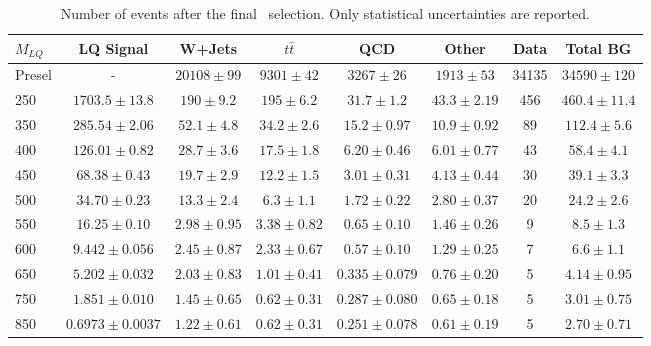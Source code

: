\begin{table} 
  \small 
  \begin{tabular}{l | c | c | c | c | c | c | c} 
    $M_{LQ}$ & LQ Signal & W+Jets & $t\bar{t}$ & QCD & Other & Data &  Total BG \\ 
    \hline 
    \hline 
    Presel & -                     &  $ 20108 \pm 99  $ & $ 9301 \pm 42   $ & $ 3267 \pm 26 $     & $ 1913 \pm 53 $   &34135 & $ 34590 \pm 120 $ \\ 
    \hline 
    250    & $ 1703.5 \pm 13.8 $   &  $ 190  \pm 9.2  $ & $ 195  \pm 6.2  $ & $ 31.7  \pm 1.2  $  & $ 43.3 \pm 2.19 $ &456 & $ 460.4 \pm 11.4 $ \\ 
    350    & $ 285.54 \pm 2.06 $   &  $ 52.1 \pm 4.8  $ & $ 34.2 \pm 2.6  $ & $ 15.2  \pm 0.97 $  & $ 10.9 \pm 0.92 $ &89 & $ 112.4 \pm 5.6 $ \\ 
    400    & $ 126.01 \pm 0.82 $   &  $ 28.7 \pm 3.6  $ & $ 17.5 \pm 1.8  $ & $ 6.20  \pm 0.46 $  & $ 6.01 \pm 0.77 $ &43 & $ 58.4 \pm 4.1 $ \\ 
    450    & $ 68.38 \pm 0.43 $    &  $ 19.7 \pm 2.9  $ & $ 12.2 \pm 1.5  $ & $ 3.01  \pm 0.31 $  & $ 4.13 \pm 0.44 $ &30 & $ 39.1 \pm 3.3 $ \\ 
    500    & $ 34.70 \pm 0.23 $    &  $ 13.3 \pm 2.4  $ & $ 6.3  \pm 1.1  $ & $ 1.72  \pm 0.22 $  & $ 2.80 \pm 0.37 $ &20 & $ 24.2 \pm 2.6 $ \\ 
    550    & $ 16.25 \pm 0.10 $    &  $ 2.98 \pm 0.95 $ & $ 3.38 \pm 0.82 $ & $ 0.65  \pm 0.10 $  & $ 1.46 \pm 0.26 $ &9 & $ 8.5 \pm 1.3 $ \\ 
    600    & $ 9.442 \pm 0.056 $   &  $ 2.45 \pm 0.87 $ & $ 2.33 \pm 0.67 $ & $ 0.57  \pm 0.10 $  & $ 1.29 \pm 0.25 $ &7 & $ 6.6 \pm 1.1 $ \\ 
    650    & $ 5.202 \pm 0.032 $   &  $ 2.03 \pm 0.83 $ & $ 1.01 \pm 0.41 $ & $ 0.335 \pm 0.079 $ & $ 0.76 \pm 0.20 $ &5 & $ 4.14 \pm 0.95 $ \\ 
    750    & $ 1.851 \pm 0.010 $   &  $ 1.45 \pm 0.65 $ & $ 0.62 \pm 0.31 $ & $ 0.287 \pm 0.080 $ & $ 0.65 \pm 0.18 $ &5 & $ 3.01 \pm 0.75 $ \\ 
    850    & $ 0.6973 \pm 0.0037 $ &  $ 1.22 \pm 0.61 $ & $ 0.62 \pm 0.31 $ & $ 0.251 \pm 0.078 $ & $ 0.61 \pm 0.19 $ &5 & $ 2.70 \pm 0.71 $ \\ 
  \end{tabular}
  \caption{Number of events after the final \enujj~selection. Only statistical uncertainties are reported.}
  \label{tab:enujjFinalSelection}
\end{table}

